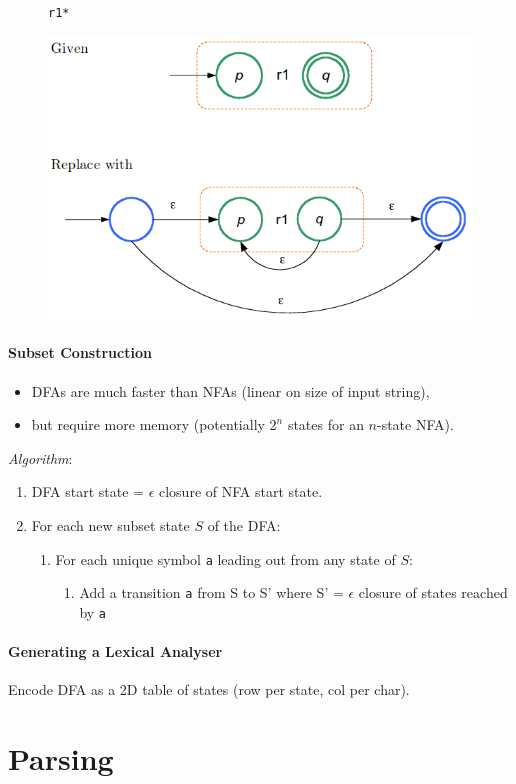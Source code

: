 \documentclass[twocolumn,english]{article}
\begin{document}
\begin{figure}[H]
\begin{centering}
\texttt{r1{*}}
\par\end{centering}
\centering{}\includegraphics[width=0.5\linewidth]{img/repeat}
\end{figure}


\paragraph{Subset Construction}
\begin{itemize}
\item DFAs are much faster than NFAs (linear on size of input string), 
\item but require more memory (potentially $2^{n}$ states for an $n$-state
NFA).
\end{itemize}
\emph{Algorithm}:
\begin{enumerate}
\item DFA start state = $\epsilon$ closure of NFA start state.
\item For each new subset state $S$ of the DFA:
\begin{enumerate}
\item For each unique symbol \texttt{a} leading out from any state of $S$:
\begin{enumerate}
\item Add a transition \texttt{a} from S to S' where S' = $\epsilon$ closure
of states reached by \texttt{a}
\end{enumerate}
\end{enumerate}
\end{enumerate}

\paragraph{Generating a Lexical Analyser}

Encode DFA as a 2D table of states (row per state, col per char).

\section{Parsing}
\end{document}
